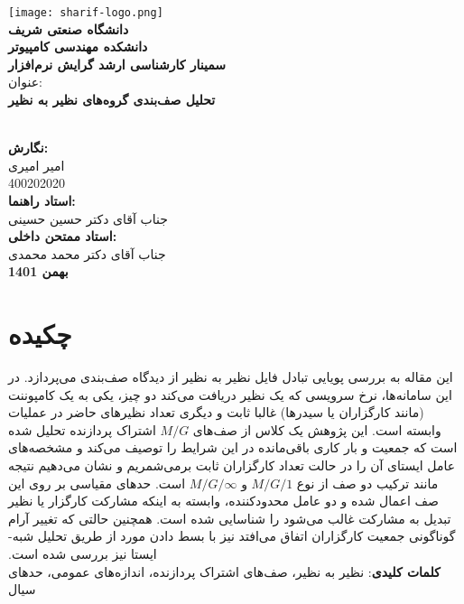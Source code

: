 \documentclass[11pt, oneside]{article}
\begin{document}
	\begin{titlepage}
		\linespread{1.5}
		\centering
		\texttt{[image: sharif-logo.png]}\\[\bigskipamount]
		\normalsize	\textbf{دانشگاه صنعتی شریف}\\
		\textbf{دانشکده مهندسی کامپیوتر}\\
		\textbf{سمینار کارشناسی ارشد گرایش نرم‌افزار}%
		\\[1.3cm]

		{\LARGE		عنوان:\\
		\textbf{تحلیل صف‌بندی گروه‌های نظیر به نظیر}\\
		\textbf{}\\[2cm]}

		{\Large
		\textbf{نگارش:} \\
		امیر امیری\\
		400202020\\[1.3cm]
		\textbf{استاد راهنما:} \\
		جناب آقای دکتر حسین حسینی\\[1.3cm]

		\textbf{استاد ممتحن داخلی:}\\
		جناب آقای دکتر محمد محمدی\\[1.3cm]
		\vfill
		\textbf{بهمن 1401}
		}
	\end{titlepage}
	\clearpage
	\setcounter{figure}{0}


\section*{چکیده}
‫این مقاله به بررسی پویایی‌ تبادل فایل نظیر به نظیر از دیدگاه صف‌بندی می‌پردازد. در این سامانه‌ها، نرخ سرویسی که یک نظیر دریافت می‌کند  دو چیز، یکی به یک کامپوننت (مانند کارگزاران یا سیدر‌ها) غالبا ثابت و دیگری تعداد نظیرهای حاضر در عملیات وابسته است. این پژوهش یک کلاس از صف‌های $M/G$ اشتراک پردازنده تحلیل شده است که جمعیت و بار کاری باقی‌مانده در این شرایط را توصیف می‌کند و مشخصه‌های عامل ایستای ‌آن را در حالت تعداد کارگزاران ثابت برمی‌شمریم و نشان می‌دهیم نتیجه مانند ترکیب دو صف از نوع $M/G/1$ و $M/G/\infty$ است. حدهای مقیاسی بر روی این صف اعمال شده و دو عامل محدودکننده، وابسته به اینکه مشارکت کارگزار یا نظیر تبدیل به مشارکت غالب می‌شود را شناسایی شده است. همچنین حالتی که تغییر آرام گوناگونی جمعیت کارگزاران اتفاق می‌افتد نیز با بسط دادن مورد از طریق تحلیل‌ شبه-ایستا نیز بررسی شده است.
\\[1ex]
\textbf{کلمات کلیدی}: نظیر به نظیر، صف‌های اشتراک پردازنده، اندا‌زه‌های عمومی، حد‌های سیال
\end{document}
